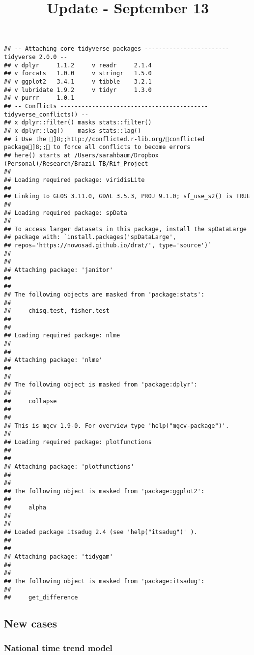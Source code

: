\documentclass[
]{article}
\title{Update - September 13}
\author{}
\date{\vspace{-2.5em}}
\begin{document}
\maketitle

\begin{verbatim}
## -- Attaching core tidyverse packages ------------------------ tidyverse 2.0.0 --
## v dplyr     1.1.2     v readr     2.1.4
## v forcats   1.0.0     v stringr   1.5.0
## v ggplot2   3.4.1     v tibble    3.2.1
## v lubridate 1.9.2     v tidyr     1.3.0
## v purrr     1.0.1     
## -- Conflicts ------------------------------------------ tidyverse_conflicts() --
## x dplyr::filter() masks stats::filter()
## x dplyr::lag()    masks stats::lag()
## i Use the ]8;;http://conflicted.r-lib.org/conflicted package]8;; to force all conflicts to become errors
## here() starts at /Users/sarahbaum/Dropbox (Personal)/Research/Brazil TB/Rif_Project
## 
## Loading required package: viridisLite
## 
## Linking to GEOS 3.11.0, GDAL 3.5.3, PROJ 9.1.0; sf_use_s2() is TRUE
## 
## Loading required package: spData
## 
## To access larger datasets in this package, install the spDataLarge
## package with: `install.packages('spDataLarge',
## repos='https://nowosad.github.io/drat/', type='source')`
## 
## 
## Attaching package: 'janitor'
## 
## 
## The following objects are masked from 'package:stats':
## 
##     chisq.test, fisher.test
## 
## 
## Loading required package: nlme
## 
## 
## Attaching package: 'nlme'
## 
## 
## The following object is masked from 'package:dplyr':
## 
##     collapse
## 
## 
## This is mgcv 1.9-0. For overview type 'help("mgcv-package")'.
## 
## Loading required package: plotfunctions
## 
## 
## Attaching package: 'plotfunctions'
## 
## 
## The following object is masked from 'package:ggplot2':
## 
##     alpha
## 
## 
## Loaded package itsadug 2.4 (see 'help("itsadug")' ).
## 
## 
## Attaching package: 'tidygam'
## 
## 
## The following object is masked from 'package:itsadug':
## 
##     get_difference
\end{verbatim}

\hypertarget{new-cases}{%
\subsection{New cases}\label{new-cases}}

\hypertarget{national-time-trend-model}{%
\subsubsection{National time trend
model}\label{national-time-trend-model}}
\end{document}
